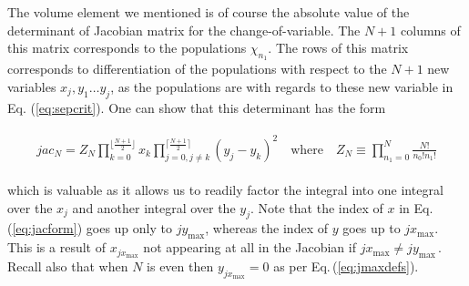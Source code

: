 \documentclass[
  12pt          %
  ,letterpaper  %
  ,center       %
  ,noupper      %
  ,english,fleqn]{uconnthesis}
\newcommand{\LeftEqns}[1]{\begin{fleqn}[\leftmargini minus \leftmargini]\begin{align}#1\end{align}\end{fleqn}}
\newcommand{\LeftEqn}[1]{\LeftEqns{\begin{split}#1\end{split}}}
\newcommand{\ceq}[1]{Eq.\,(\ref{#1})}
\newcommand{\noeq}[1]{(\ref{#1})}
\begin{document}
The volume element we mentioned is of course the absolute value of the determinant of Jacobian matrix for the change-of-variable. The $N+1$ columns of this matrix corresponds to the populations $\chi_{n_1}$. The rows of this matrix corresponds to differentiation of the populations with respect to the $N+1$ new variables $x_j, y_1 \dots y_j$, as the populations are with regards to these new variable in Eq. \noeq{eq:sepcrit}. One can show that this determinant has the form
\LeftEqn{\label{eq:jacform}
jac_N=Z_N \prod\limits_{k=0}^{\lfloor\frac{N+1}{2}\rfloor}{x_k\prod\limits_{j=0,j\neq k}^{\lceil\frac{N+1}{2}\rceil}{\left(y_j-y_k\right)^2}}\quad\text{where}\quad Z_N \equiv \prod\limits_{n_1=0}^N{\frac{N!}{n_0! n_1!}}
}
which is valuable as it allows us to readily factor the integral into one integral over the $x_j$ and another integral over the $y_j$. Note that the index of $x$ in \ceq{eq:jacform} goes up only to $jy_\text{max}$, whereas the index of $y$ goes up to $jx_\text{max}$. This is a result of $x_{jx_\text{max}}$ not appearing at all in the Jacobian if ${jx_\text{max}}\neq {jy_\text{max}}\,$. Recall also that when $N$ is even then $y_{jx_\text{max}}=0$ as per \ceq{eq:jmaxdefs}.
\end{document}
